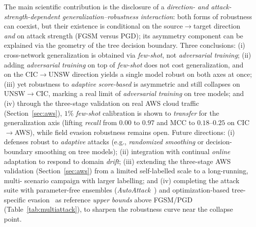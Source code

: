 \documentclass[preprint,12pt,authoryear]{elsarticle}
\begin{document}
\noindent The main scientific contribution is the disclosure of a
\emph{direction- and attack-strength-dependent generalization--robustness
interaction}: both forms of robustness can coexist, but their existence is
conditional on the source$\rightarrow$target direction \emph{and} on attack strength
(FGSM versus PGD); its asymmetry component can be explained via the geometry of the
tree decision boundary. Three conclusions: (i) cross-network
generalization is obtained via \emph{few-shot}, not \emph{adversarial training};
(ii) adding \emph{adversarial training} on top of \emph{few-shot} does not cost
generalization, and on the CIC$\rightarrow$UNSW direction yields a single model
robust on both axes at once; (iii) yet robustness to \emph{adaptive score-based} is
asymmetric and still collapses on UNSW$\rightarrow$CIC, marking a real limit of
\emph{adversarial training} on tree models; and (iv) through the three-stage
validation on real AWS cloud traffic (Section~\ref{sec:aws}), $1\%$ \emph{few-shot}
calibration is shown to \emph{transfer} for the generalization axis (lifting
\emph{recall} from $0.00$ to $0.97$ and MCC to $0.18$--$0.25$ on CIC$\rightarrow$AWS),
while field evasion robustness remains open. Future directions: (i) defenses robust
to \emph{adaptive} attacks (e.g., \emph{randomized smoothing} or decision-boundary
smoothing on tree models); (ii) integration with continual \emph{online} adaptation
to respond to domain \emph{drift}; (iii) extending the three-stage AWS validation
(Section~\ref{sec:aws}) from a limited self-labelled scale to a long-running, multi-
scenario campaign with larger labelling; and (iv) completing the attack suite with
parameter-free ensembles (\emph{AutoAttack}~\citep{croce2020autoattack}) and
optimization-based tree-specific evasion~\citep{kantchelian2016} as reference
\emph{upper bounds} above FGSM/PGD (Table~\ref{tab:multiattack}), to sharpen the
robustness curve near the collapse point.
\end{document}
